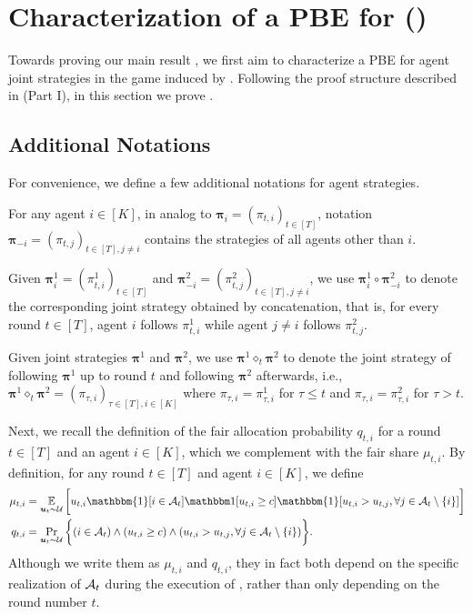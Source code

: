\section{Characterization of a PBE for \mechname ()}\label{sec:appendix varying-p}

Towards proving our main result , we first aim to characterize a PBE for agent joint strategies in the game induced by \mechname. Following the proof structure described in  (Part I), in this section we prove .

\subsection{Additional Notations}\label{sec:appendix additional notations varying-p}

For convenience, we define a few additional notations for agent strategies.

\begin{definition}
For any agent $i\in [K]$, in analog to $\bm \pi_i=(\pi_{t,i})_{t\in [T]}$, notation $\bm \pi_{-i}=(\pi_{t,j})_{t\in [T],j\ne i}$ contains the strategies of all agents other than $i$.

Given $\bm \pi_i^1=(\pi_{t,i}^1)_{t\in [T]}$ and $\bm \pi_{-i}^2=(\pi_{t,j}^2)_{t\in [T],j\ne i}$, we use $\bm \pi_i^1 \circ \bm \pi_{-i}^2$ to denote the corresponding joint strategy obtained by concatenation, that is, for every round $t\in [T]$, agent $i$ follows $\pi_{t,i}^1$ while agent $j\ne i$ follows $\pi_{t,j}^2$.

Given joint strategies $\bm \pi^1$ and $\bm \pi^2$, we use $\bm \pi^1\diamond_t \bm \pi^2$ to denote the joint strategy of following $\bm \pi^1$ up to round $t$ and following $\bm \pi^2$ afterwards, i.e., $\bm \pi^1\diamond_t \bm \pi^2=(\pi_{\tau,i})_{\tau\in [T],i\in [K]}$ where $\pi_{\tau,i}=\pi_{\tau,i}^1$ for $\tau\leq t$ and $\pi_{\tau,i}=\pi_{\tau,i}^2$ for $\tau>t$.
\end{definition}

Next, we recall the definition of the fair allocation probability $q_{t,i}$ for a round $t\in[T]$ and an agent $i\in[K]$, which we complement with the fair share $\mu_{t,i}$. By definition, for any round $t\in [T]$ and agent $i\in [K]$, we define
\begin{align}
\mu_{t,i}&= \E_{\bm u_t\sim \mV}\bigg [u_{t,i}\mathbbm{1}[i\in \mA_t] \1[u_{t,i}\geq c]\mathbbm{1}[u_{t,i}>u_{t,j},\forall j\in \mA_t\setminus \{i\}]\bigg ] \nonumber\\
q_{t,i}&=\Pr_{\bm u_t\sim \mV}\bigg \{(i\in \mA_t)\wedge (u_{t,i}\geq c) \wedge (u_{t,i}>u_{t,j},\forall j\in \mA_t\setminus \{i\})\bigg \}.\label{eq:fair share}
\end{align}
Although we write them as $\mu_{t,i}$ and $q_{t,i}$, they in fact both depend on the specific realization of $\mathcal{A}_t$ during the execution of , rather than only depending on the round number $t$.

